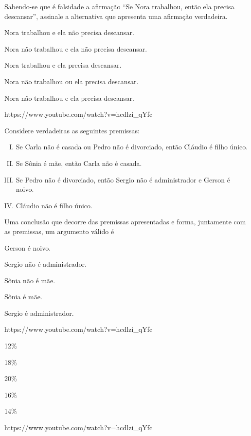 \questao{}
{Sabendo-se que é falsidade a afirmação “Se Nora trabalhou, então ela precisa descansar”, assinale a alternativa que apresenta uma afirmação verdadeira.
}
{
\item Nora trabalhou e ela não precisa descansar.
\item Nora não trabalhou e ela não precisa descansar.
\item Nora trabalhou e ela precisa descansar.
\item Nora não trabalhou ou ela precisa descansar.
\item Nora não trabalhou e ela precisa descansar.}
{https://www.youtube.com/watch?v=hcdlzi_qYfc}

\questao{}
{Considere verdadeiras as seguintes premissas:
\begin{enumerate}[I.]
\item Se Carla não é casada ou Pedro não é divorciado, então Cláudio é filho único.
\item Se Sônia é mãe, então Carla não é casada.
\item Se Pedro não é divorciado, então Sergio não é administrador e Gerson é noivo.
\item Cláudio não é filho único.
\end{enumerate}
Uma conclusão que decorre das premissas apresentadas e forma, juntamente com as premissas, um argumento
válido é}
{
\item Gerson é noivo.
\item Sergio não é administrador.
\item Sônia não é mãe.
\item Sônia é mãe.
\item Sergio é administrador.}
{https://www.youtube.com/watch?v=hcdlzi_qYfc}

{
\item 12\%
\item 18\%
\item 20\%
\item 16\%
\item 14\%}
{https://www.youtube.com/watch?v=hcdlzi_qYfc}


